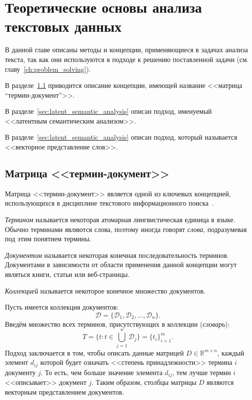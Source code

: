 \chapter{Теоретические основы анализа текстовых данных}

В данной главе описаны методы и концепции, применяющиеся в
задачах анализа текста, так как они используются в подходе
к решению поставленной задачи (см. главу~\ref{ch:problem_solving}).

В разделе~\ref{sec:term_document_matrix} приводится описание
концепции, имеющей название <<матрица “термин-документ”>>.

В разделе~\ref{sec:latent_semantic_analysis} описан подход,
именуемый <<латентным семантическим анализом>>.

В разделе~\ref{sec:latent_semantic_analysis} описан подход,
который называется <<векторное представление слов>>.

\section{Матрица <<термин-документ>>}
\label{sec:term_document_matrix}

Матрица <<термин-документ>> является одной из ключевых концепцией,
использующихся в дисциплине текстового информационного 
поиска~\cite{manning2008introduction}. 

\textit{Термином} называется некоторая атомарная лингвистическая
единица в языке. Обычно терминами являются слова, поэтому иногда
говорят \textit{слова}, подразумевая под этим понятием термины.

\textit{Документом} называется некоторая конечная последовательность
терминов. Документами в зависимости от области применения данной концепции
могут являться книги, статьи или веб-страницы.

\textit{Коллекцией} называется некоторое конечное множество документов.

Пусть имеется коллекция документов:
\[
    \mathcal{D} = \{\mathcal{D}_1, \mathcal{D}_2,...,\mathcal{D}_n\}.
\]
Введём множество всех терминов, присутствующих в коллекции (\textit{словарь}):
\[
    T = \{t \colon t \in \bigcup_{j=1}^{n} \mathcal{D}_j\} = \{t_i\}_{i=1}^{m}.
\]
Подход заключается в том, чтобы описать данные матрицей 
$D \in \mathbb{R}^{m \times n}$, каждый элемент $d_{ij}$ которой будет
означать <<степень принадлежности>> термина $i$ документу $j$. То есть,
чем больше значение элемента $d_{ij}$, тем лучше термин $i$ <<описывает>>
документ $j$. Таким образом, столбцы матрицы $D$ являются векторным
представлением документов.

